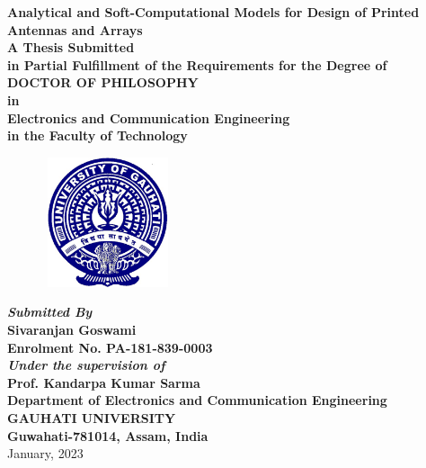 \begin{titlepage}
\begin{center}
{\Large \bf Analytical and Soft-Computational Models for Design of Printed Antennas and Arrays} \\ [5ex]


{\normalsize{ \textbf{A Thesis Submitted \\in
 Partial Fulfillment of the Requirements for the Degree of \\\large \bf
DOCTOR OF PHILOSOPHY\\
in \\
Electronics and Communication Engineering \\
in the Faculty of Technology}}}\\
[6ex]

\begin{figure}[h]
\centering
\includegraphics[width=1.5in,height=1.5in]{clogoe.eps}\\
\end{figure}

{\sl \textbf{Submitted By}} \\[2ex]
{\sf \sf \textbf{Sivaranjan Goswami\\
Enrolment No. PA-181-839-0003}}\\[4ex]
{\sl \textbf{Under the supervision of}} \\[2ex]
{\sf \sf \textbf{Prof. Kandarpa Kumar Sarma}}\\ [6ex]


\vspace{0.5in}
{\large \bf Department of Electronics and Communication Engineering}  \\[1ex]
{\large \bf{GAUHATI UNIVERSITY}} \\[1ex]
{\large \bf{Guwahati-781014, Assam, India}} \\[1ex]
{\normalsize January, 2023}
\end{center}
\end{titlepage}
